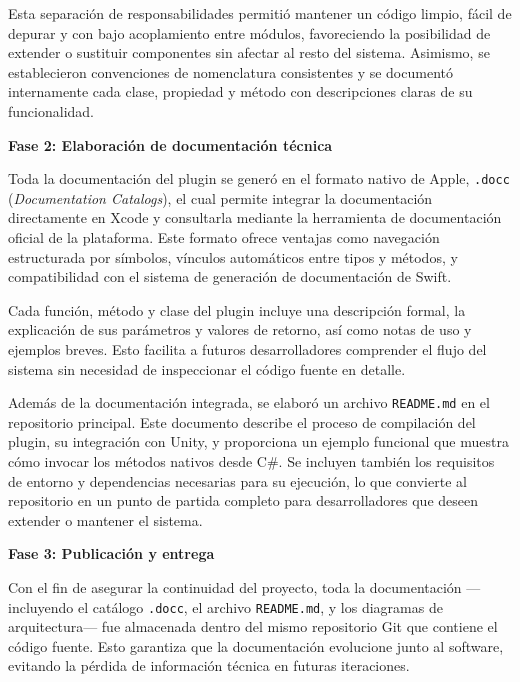 Esta separación de responsabilidades permitió mantener un código limpio, fácil de depurar y con bajo acoplamiento entre módulos, favoreciendo la posibilidad de extender o sustituir componentes sin afectar al resto del sistema. Asimismo, se establecieron convenciones de nomenclatura consistentes y se documentó internamente cada clase, propiedad y método con descripciones claras de su funcionalidad. %


\textbf{Fase 2: Elaboración de documentación técnica}

Toda la documentación del plugin se generó en el formato nativo de Apple, \texttt{.docc} (\textit{Documentation Catalogs}), el cual permite integrar la documentación directamente en Xcode y consultarla mediante la herramienta de documentación oficial de la plataforma. Este formato ofrece ventajas como navegación estructurada por símbolos, vínculos automáticos entre tipos y métodos, y compatibilidad con el sistema de generación de documentación de Swift. %

Cada función, método y clase del plugin incluye una descripción formal, la explicación de sus parámetros y valores de retorno, así como notas de uso y ejemplos breves. Esto facilita a futuros desarrolladores comprender el flujo del sistema sin necesidad de inspeccionar el código fuente en detalle. %

Además de la documentación integrada, se elaboró un archivo \texttt{README.md} en el repositorio principal. Este documento describe el proceso de compilación del plugin, su integración con Unity, y proporciona un ejemplo funcional que muestra cómo invocar los métodos nativos desde C\#. Se incluyen también los requisitos de entorno y dependencias necesarias para su ejecución, lo que convierte al repositorio en un punto de partida completo para desarrolladores que deseen extender o mantener el sistema. %


\textbf{Fase 3: Publicación y entrega}

Con el fin de asegurar la continuidad del proyecto, toda la documentación —incluyendo el catálogo \texttt{.docc}, el archivo \texttt{README.md}, y los diagramas de arquitectura— fue almacenada dentro del mismo repositorio Git que contiene el código fuente. Esto garantiza que la documentación evolucione junto al software, evitando la pérdida de información técnica en futuras iteraciones. %

